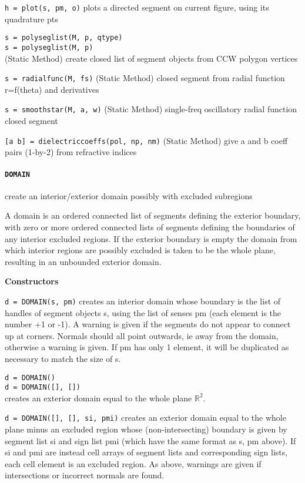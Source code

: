{\tt h = plot(s, pm, o)} plots a directed segment on current
figure, using its quadrature pts


{\tt s = polyseglist(M, p, qtype)}\\
{\tt s = polyseglist(M, p)}\\
(Static Method) create closed list of segment objects from CCW polygon vertices

{\tt s = radialfunc(M, fs)} (Static Method) closed segment from
radial function r=f(theta) and derivatives

{\tt s = smoothstar(M, a, w)} (Static Method) single-freq
oscillatory radial function closed segment

{\tt [a b] = dielectriccoeffs(pol, np, nm)} (Static Method) give a
and b coeff pairs (1-by-2) from refractive indices


 
\newpage

\paragraph{\tt DOMAIN} create an interior/exterior domain possibly with
excluded subregions

A domain is an ordered connected list of segments defining the exterior
boundary, with zero or more ordered connected lists of segments defining the
boundaries of any interior excluded regions. If the exterior boundary is empty
the domain from which interior regions are possibly excluded is taken to be
the whole plane, resulting in an unbounded exterior domain.

\textbf{Constructors}

{\tt d = DOMAIN(s, pm)} creates an interior domain whose boundary is the list
of handles of segment objects s, using the list of senses pm (each element
is the number +1 or -1). A warning is given if the segments do not appear
to connect up at corners. Normals should all point outwards, ie away from
the domain, otherwise a warning is given. If pm has only 1 element, it will
be duplicated as necessary to match the size of s.

{\tt d = DOMAIN()}\\
{\tt d = DOMAIN([], [])}\\
creates an exterior domain equal to the
whole plane $\mathbb{R}^2$.

{\tt d = DOMAIN([], [], si, pmi)} creates an exterior domain equal to the whole
plane minus an excluded region whose (non-intersecting) boundary is given
by segment list si and sign list pmi (which have the same format as s, pm
above). If si and pmi are instead cell arrays of segment lists and
corresponding sign lists, each cell element is an excluded region. As
above, warnings are given if intersections or incorrect normals are found.


